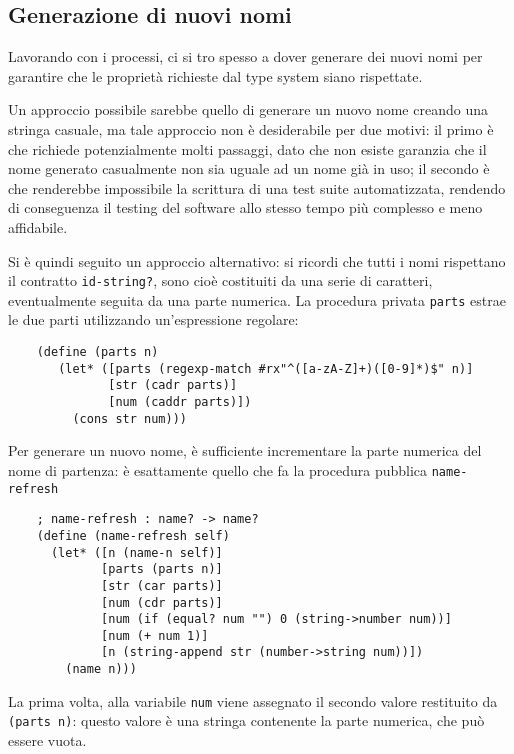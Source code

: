 \subsection{Generazione di nuovi nomi}

Lavorando con i processi, ci si tro spesso a dover generare dei
nuovi nomi per garantire che le propriet\`a richieste dal type system
siano rispettate.

Un approccio possibile sarebbe quello di generare un nuovo nome creando
una stringa casuale, ma tale approccio non \`e desiderabile per due
motivi: il primo \`e che richiede potenzialmente molti passaggi, dato
che non esiste garanzia che il nome generato casualmente non sia uguale
ad un nome gi\`a in uso; il secondo \`e che renderebbe impossibile la
scrittura di una test suite automatizzata, rendendo di conseguenza il
testing del software allo stesso tempo pi\`u complesso e meno affidabile.

Si \`e quindi seguito un approccio alternativo: si ricordi che tutti i
nomi rispettano il contratto \lstinline{id-string?}, sono cio\`e
costituiti da una serie di caratteri, eventualmente seguita da una parte
numerica. La procedura privata \lstinline{parts} estrae le due parti
utilizzando un'espressione regolare:

\begin{lstlisting}
    (define (parts n)
       (let* ([parts (regexp-match #rx"^([a-zA-Z]+)([0-9]*)$" n)]
              [str (cadr parts)]
              [num (caddr parts)])
         (cons str num)))
\end{lstlisting}

Per generare un nuovo nome, \`e sufficiente incrementare la parte numerica
del nome di partenza: \`e esattamente quello che fa la procedura pubblica
\lstinline{name-refresh}

\begin{lstlisting}
    ; name-refresh : name? -> name?
    (define (name-refresh self)
      (let* ([n (name-n self)]
             [parts (parts n)]
             [str (car parts)]
             [num (cdr parts)]
             [num (if (equal? num "") 0 (string->number num))]
             [num (+ num 1)]
             [n (string-append str (number->string num))])
        (name n)))
\end{lstlisting}

La prima volta, alla variabile \lstinline{num} viene assegnato il secondo
valore restituito da \lstinline{(parts n)}: questo valore \`e una stringa
contenente la parte numerica, che pu\`o essere vuota.

